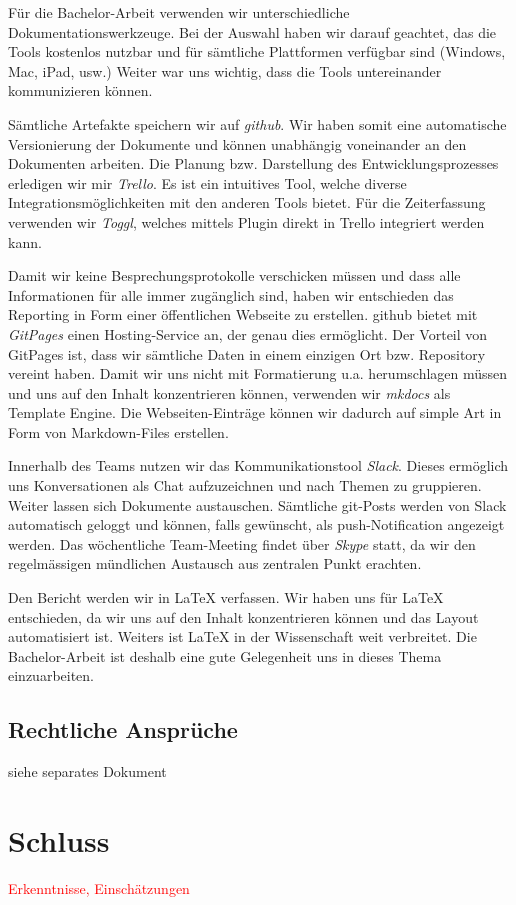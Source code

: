 \documentclass[a4paper,ngerman, 11pt]{report}
\newcommand\Diskussionspunkt[1]{\textcolor{red}{#1}}
\begin{document}
Für die Bachelor-Arbeit verwenden wir unterschiedliche Dokumentationswerkzeuge. Bei der Auswahl haben wir darauf geachtet, das die Tools kostenlos nutzbar und für sämtliche Plattformen verfügbar sind (Windows, Mac, iPad, usw.) Weiter war uns wichtig, dass die Tools untereinander kommunizieren können. 

Sämtliche Artefakte speichern wir auf \textit{github}. Wir haben somit eine automatische Versionierung der Dokumente und können unabhängig voneinander an den Dokumenten arbeiten. Die Planung bzw. Darstellung des Entwicklungsprozesses erledigen wir mir \textit{Trello}. Es ist ein intuitives Tool, welche diverse Integrationsmöglichkeiten mit den anderen Tools bietet. Für die Zeiterfassung verwenden wir \textit{Toggl}, welches mittels Plugin direkt in Trello integriert werden kann.

Damit wir keine Besprechungsprotokolle verschicken müssen und dass alle Informationen für alle immer zugänglich sind, haben wir entschieden das Reporting in Form einer öffentlichen Webseite zu erstellen. github bietet mit \textit{GitPages} einen Hosting-Service an, der genau dies ermöglicht. Der Vorteil von GitPages ist, dass wir sämtliche Daten in einem einzigen Ort bzw. Repository vereint haben. Damit wir uns nicht mit Formatierung u.a. herumschlagen müssen und uns auf den Inhalt konzentrieren können, verwenden wir \textit{mkdocs} als Template Engine. Die Webseiten-Einträge können wir dadurch auf simple Art in Form von Markdown-Files erstellen.

Innerhalb des Teams nutzen wir das Kommunikationstool \textit{Slack}. Dieses ermöglich uns Konversationen als Chat aufzuzeichnen und nach Themen zu gruppieren. Weiter lassen sich Dokumente austauschen. Sämtliche git-Posts werden von Slack automatisch geloggt und können, falls gewünscht, als push-Notification angezeigt werden.
Das wöchentliche Team-Meeting findet über \textit{Skype} statt, da wir den regelmässigen mündlichen Austausch aus zentralen Punkt erachten.

Den Bericht werden wir in LaTeX verfassen. Wir haben uns für LaTeX entschieden, da wir uns auf den Inhalt konzentrieren können und das Layout automatisiert ist. Weiters ist LaTeX in der Wissenschaft weit verbreitet. Die Bachelor-Arbeit ist deshalb eine gute Gelegenheit uns in dieses Thema einzuarbeiten.


\section{Rechtliche Ansprüche}
siehe separates Dokument


\chapter{Schluss}
\Diskussionspunkt{Erkenntnisse, Einschätzungen}




{}	

\end{document}
